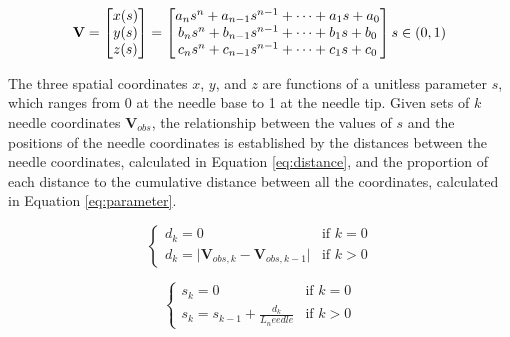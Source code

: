 \begin{equation}
\label{eq:curve_vector}
\textbf{V}=\begin{bmatrix}x(s) \\ y(s) \\ z(s) \end{bmatrix}=\begin{bmatrix}a_n s^n + a_{n-1} s^{n-1} + \dots + a_1 s + a_0 \\ b_n s^n + b_{n-1} s^{n-1} + \dots + b_1 s + b_0 \\ c_n s^n + c_{n-1} s^{n-1} + \dots + c_1 s + c_0 \end{bmatrix} \\
 s\in (0, 1)
 \end{equation}


The three spatial coordinates $x$, $y$, and $z$ are functions of a unitless parameter $s$, which ranges from 0 at the needle base to 1 at the needle tip. Given sets of $k$ needle coordinates $\textbf{V}_{obs}$, the relationship between the values of $s$ and the positions of the needle coordinates is established by the distances between the needle coordinates, calculated in Equation \ref{eq:distance}, and the proportion of each distance to the cumulative distance between all the coordinates, calculated in Equation \ref{eq:parameter}.

\begin{equation}
\label{eq:distance}
\begin{cases}
d_k = 0 &\mbox{if } k=0 \\
d_k = \lvert \textbf{V}_{obs,k} - \textbf{V}_{obs,k-1}\rvert &\mbox{if } k>0
\end{cases}
\end{equation}

\begin{equation}
\label{eq:parameter}
\begin{cases}
s_k = 0 &\mbox{if } k=0 \\
s_k = s_{k-1} + \frac{d_k}{L_needle}&\mbox{if } k>0
\end{cases}
\end{equation}


